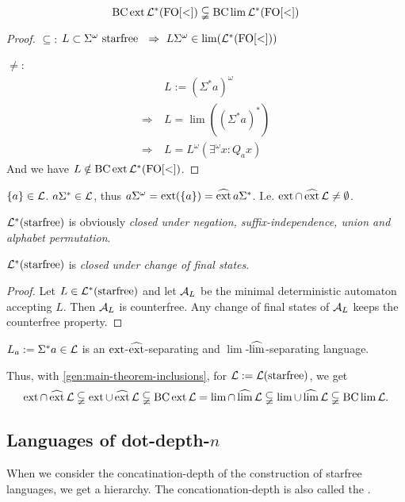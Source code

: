 \begin{theorem}
\[ \operatorname{BC} \operatorname{ext} \mathcal{L}^*( \mathrm{FO[<]} ) \subsetneqq \operatorname{BC} \lim \mathcal{L}^* ( \mathrm{FO[<]} ) \]
\begin{proof}
$\subseteq$: $L \subset \Sigma^\omega \text{ starfree } \ \Rightarrow\ L \Sigma^\omega \in \lim( \Lang^*( \mathrm{FO[<]} ) )$

$\neq$:
\begin{align*}
& L := (\Sigma^* a)^\omega \\
\Rightarrow \ & L = \lim( (\Sigma^* a)^* ) \\
\Rightarrow \ & L = L^\omega(\exists^\omega x : Q_a x)
\end{align*}
And we have $L \notin \operatorname{BC} \operatorname{ext} \mathcal{L}^* (\mathrm{FO[<]})$.
\end{proof}
\end{theorem}

$\Set{a} \in \Lang$. $a \Sigma^* \in \mathcal{L}$, thus $a\Sigma^\omega = \ext(\Set{a}) = \dext{a\Sigma^*}$. I.e. $\operatorname{ext} \cap \operatorname{\widehat{ext}} \mathcal{L} \ne \emptyset$.

$\mathcal{L}^*(\textup{\textrm{starfree}})$ is obviously \emph{closed under negation, suffix-independence, union and alphabet permutation}.

\begin{lemma}
\label{lang:starfree:closurefinalstates}
$\mathcal{L}^*(\textup{\textrm{starfree}})$ is \emph{closed under change of final states}.
\begin{proof}
Let $L \in \mathcal{L}^*(\textup{\textrm{starfree}})$ and let $\mathcal{A}_L$ be the minimal deterministic automaton accepting $L$. Then $\mathcal{A}_L$ is counterfree. Any change of final states of $\mathcal{A}_L$ keeps the counterfree property.
\end{proof}
\end{lemma}

$L_a := \Sigma^* a \in \mathcal{L}$ is an $\operatorname{ext}$-$\operatorname{\widehat{ext}}$-separating and $\lim$-$\operatorname{\widehat{lim}}$-separating language.

Thus, with \cref{gen:main-theorem-inclusions}, for $\mathcal{L} := \mathcal{L}(\textup{\textrm{starfree}})$, we get
\[ \operatorname{ext} \cap \operatorname{\widehat{ext}} \mathcal{L} \subsetneqq
\operatorname{ext} \cup \operatorname{\widehat{ext}} \mathcal{L} \subsetneqq
\operatorname{BC} \operatorname{ext} \mathcal{L} =
\lim \cap \operatorname{\widehat{lim}} \mathcal{L} \subsetneqq
\lim \cup \operatorname{\widehat{lim}} \mathcal{L} \subsetneqq
\operatorname{BC} \lim \mathcal{L} . \]


\subsection{Languages of dot-depth-$n$}
\label{lang:dotdepth}
When we consider the concatination-depth of the construction of starfree languages, we get a hierarchy. The concationation-depth is also called the .

